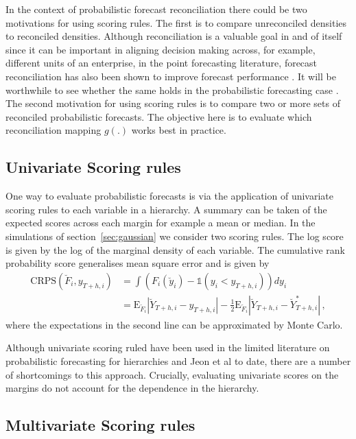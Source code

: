 \documentclass[a4paper, 11pt]{article}
\def\E{\text{E}}
\theoremstyle{theo}
\theoremstyle{definition}
\begin{document}
In the context of probabilistic forecast reconciliation there could be two motivations for using scoring rules.  The first is to compare unreconciled densities to reconciled densities.  Although reconciliation is a valuable goal in and of itself since it can be important in aligning decision making across, for example, different units of an enterprise, in the point forecasting literature, forecast reconciliation has also been shown to improve forecast performance .  It will be worthwhile to see whether the same holds in the probabilistic forecasting case .  The second motivation for using scoring rules is to compare two or more sets of reconciled probabilistic forecasts.  The objective here is to evaluate which reconciliation mapping $g(.)$ works best in practice.

\subsection{Univariate Scoring rules}

One way to evaluate probabilistic forecasts is via the application of univariate scoring rules to each variable in a hierarchy.  A summary can be taken of the expected scores across each margin for example a mean or median.  In the simulations of section~\ref{sec:gaussian} we consider two scoring rules.  The log score is given by the log of the marginal density of each variable.  The cumulative rank probability score generalises mean square error and is given by
\begin{align} \label{eq:CRPS}
\text{CRPS}(\breve{F}_i,y_{T+h,i}) &=\int \left(F_i(\breve{y}_i)-\mathbb{1}(y_i<y_{T+h,i})\right)dy_i\\ &=\E_{\breve{F}_i}|\breve{Y}_{T+h,i}-y_{T+h,i}| - \frac{1}{2}\E_{\breve{F}_i}|\breve{Y}_{T+h,i}-\breve{Y}^*_{T+h,i}|\,,
\end{align}
where the expectations in the second line can be approximated by Monte Carlo.

Although univariate scoring ruled have been used in the limited literature on probabilistic forecasting for hierarchies \cite{BenTaieb2017} and Jeon et al  to date, there are a number of shortcomings to this approach.  Crucially, evaluating univariate scores on the margins do not account for the dependence in the hierarchy. 

\subsection{Multivariate Scoring rules}
\end{document}
